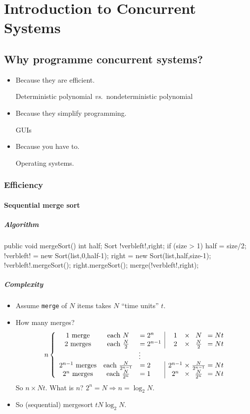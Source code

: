 \documentclass{article}
\begin{document}
\section{Introduction to Concurrent Systems}
\subsection{Why programme concurrent systems?}

\begin{itemize}
\item Because they are efficient.

Deterministic polynomial {\em vs.}\ nondeterministic polynomial
\item Because they simplify programming.

GUIs
\item Because you have to.

Operating systems.
\end{itemize}


\subsubsection{Efficiency}
\paragraph{Sequential merge sort}
\subparagraph{Algorithm}
\begin{flushleft}
  public void mergeSort() {
    int half; Sort !verbleft!,right;
    if (size > 1) {
      half = size/2;
      !verbleft! = new Sort(list,0,half-1);
      right = new Sort(list,half,size-1);
      !verbleft!.mergeSort(); right.mergeSort();
      merge(!verbleft!,right);
    }
  }
\EndSystem
\end{flushleft}

\subparagraph{Complexity}
\begin{itemize}
\item Assume {\tt merge} of $N$ items takes ${N}$ ``time units'' $t$.
\item How many merges?
\begin{displaymath}
n\left\{\begin{array}{ccl|c@{\;\times\;}c@{\;=\;}c@{t}}
1~\mbox{merge} & \mbox{each}~N & =2^n & 1 & {N} & {N}\\
2~\mbox{merges} & \mbox{each}~{N\over 2} & =2^{n-1} & 2 & {{N\over 2}} & {N}\\
\multicolumn{6}{c}{\vdots}\\
2^{n-1}~\mbox{merges} & \mbox{each}~{N\over{2^{n-1}}} & =2 & 2^{n-1} & {{N\over{2^{n-1}}}} & {N}\\
2^n~\mbox{merges} & \mbox{each}~{N\over{2^n}} & =1 & 2^n & {{N\over{2^n}}} & {N}
\end{array}\right.
\end{displaymath}
So $n\times{N}t$.  What is $n$?  $2^n=N\Rightarrow n={\log_2 N}$.
\item So (sequential) mergesort ${tN\log_2 N}$.
\end{itemize}
\end{document}
